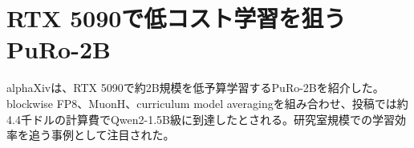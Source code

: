 \section{RTX 5090で低コスト学習を狙うPuRo-2B}
alphaXivは、RTX 5090で約2B規模を低予算学習するPuRo-2Bを紹介した。blockwise FP8、MuonH、curriculum model averagingを組み合わせ、投稿では約4.4千ドルの計算費でQwen2-1.5B級に到達したとされる。研究室規模での学習効率を追う事例として注目された。

